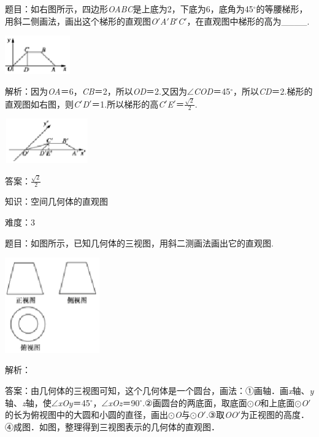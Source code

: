 \documentclass{article} %
\begin{document}
题目：如右图所示，四边形\textit{OABC}是上底为2，下底为6，底角为45$\mathrm{{}^\circ}$的等腰梯形，用斜二侧画法，画出这个梯形的直观图\textit{O}$'$\textit{A}$'$\textit{B}$'$\textit{C}$'$，在直观图中梯形的高为\_\_\_\_.



\includegraphics*[width=1.10in, height=0.65in, keepaspectratio=false]{image58}

解析：因为\textit{OA}＝6，\textit{CB}＝2，所以\textit{OD}＝2.又因为$\mathrm{\angle}$\textit{COD}＝45$\mathrm{{}^\circ}$，所以\textit{CD}＝2.梯形的直观图如右图，则\textit{C}$'$\textit{D}$'$＝1.所以梯形的高\textit{C}$'$\textit{E}$'$＝$\frac{\sqrt{2}}{2}$.

\includegraphics*[width=1.42in, height=0.75in, keepaspectratio=false]{image59}

答案：$\frac{\sqrt{2}}{2}$

知识：空间几何体的直观图

难度：3

题目：如图所示，已知几何体的三视图，用斜二测画法画出它的直观图.

\includegraphics*[width=1.60in, height=1.61in, keepaspectratio=false]{image60}

解析：

答案：由几何体的三视图可知，这个几何体是一个圆台，画法：①画轴．画\textit{x}轴、\textit{y}轴、\textit{z}轴，使$\mathrm{\angle}$\textit{xOy}＝45$\mathrm{{}^\circ}$，$\mathrm{\angle}$\textit{xOz}＝90$\mathrm{{}^\circ}$.②画圆台的两底面，取底面$\mathrm{\odot}$\textit{O}和上底面$\mathrm{\odot}$\textit{O}$'$的长为俯视图中的大圆和小圆的直径，画出$\mathrm{\odot}$\textit{O}与$\mathrm{\odot}$\textit{O}$'$.③取\textit{OO}$'$为正视图的高度．④成图．如图，整理得到三视图表示的几何体的直观图．
\end{document}
